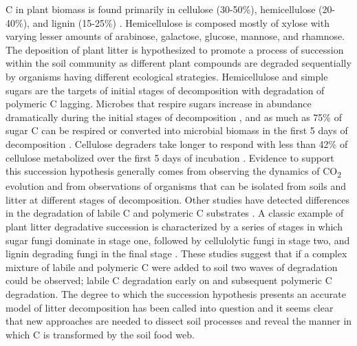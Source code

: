 C in plant biomass is found primarily in cellulose (30-50\%), hemicellulose (20-40\%), and lignin (15-25\%) \cite{Lynd_2002}. Hemicellulose is composed mostly of xylose with varying lesser amounts of arabinose, galactose, glucose, mannose, and rhamnose. The deposition of plant litter is hypothesized to promote a process of succession within the soil community as different plant compounds are degraded sequentially by organisms having different ecological strategies. Hemicellulose and simple sugars are the targets of initial stages of decomposition with degradation of polymeric C lagging. Microbes that respire sugars increase in abundance dramatically during the initial stages of decomposition \cite{GARRETT_1951,Alexander_1964}, and as much as 75\% of sugar C can be respired or converted into microbial biomass in the first 5 days of decomposition \cite{Engelking_2007}. Cellulose degraders take longer to respond \cite{Hu_1997} with less than 42\% of cellulose metabolized over the first 5 days of incubation \cite{Engelking_2007}. Evidence to support this succession hypothesis generally comes from observing the dynamics of CO\textsubscript{2} evolution and from observations of organisms that can be isolated from soils and litter at different stages of decomposition. Other studies have detected differences in the degradation of labile C and polymeric C substrates \cite{Engelking_2007,Anderson_1973,Stotzky_1961,Alden_2001,Furukawa_1996,Fontaine_2003,Blagodatskaya_2007,Jenkins_2010,Rui_2009,Fierer_2010}. A classic example of plant litter degradative succession is characterized by a series of stages in which sugar fungi dominate in stage one, followed by cellulolytic fungi in stage two, and lignin degrading fungi in the final stage \cite{Gessner_2010}. These studies suggest that if a complex mixture of labile and polymeric C were added to soil two waves of degradation could be observed; labile C degradation early on and subsequent polymeric C degradation. The degree to which the succession hypothesis presents an accurate model of litter decomposition has been called into question \cite{Kj_ller_1982,Frankland_1998,Osono_2005} and it seems clear that new approaches are needed to dissect soil processes and reveal the manner in which C is transformed by the soil food web.  
 



